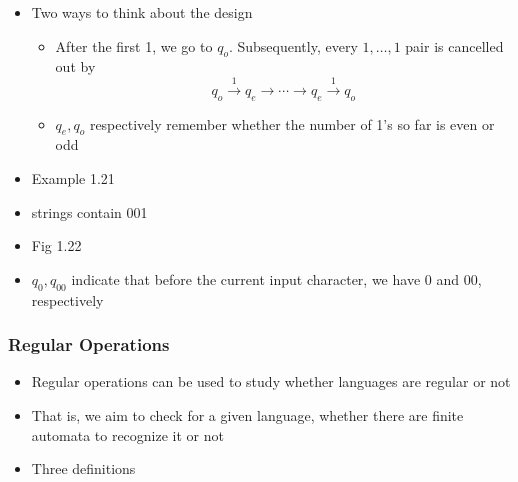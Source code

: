 \begin{frame}[allowframebreaks]
\begin{itemize}
\item Two ways to think about the design
  \begin{itemize}
  \item After the first 1, we go to $q_o$. Subsequently, every $1, \ldots, 1$ pair is cancelled out by
  \begin{equation*}
q_o \xrightarrow{1} q_e \rightarrow \cdots \rightarrow q_e
    \xrightarrow{1} q_o
  \end{equation*}
\item $q_e, q_o$ respectively remember whether the number of 1's
  so far is even or odd
  \end{itemize}
\item Example 1.21
  
\item [] strings contain 001

\item [] Fig 1.22

\begin{center}
    \end{center}
  \item $q_0, q_{00}$ indicate that before the current input character,
    we have 0 and 00, respectively
\end{itemize}\end{frame} \begin{frame}[allowframebreaks] \frametitle{Regular Operations}
  \begin{itemize}
\item Regular operations can be used to study whether languages are regular or not

\item  That is, we aim to check for a given language,
  whether there are finite automata to recognize it or not
\item Three definitions


\end{itemize}
\end{frame}
